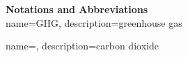 \clearpage %

\noindent

{\Huge{\bf{Notations and Abbreviations}}}\
\\[6pt] 

{
    name=GHG,
    description={greenhouse gas}
}

{
    name=,
    description={carbon dioxide}
}

\printglossaries

\newpage